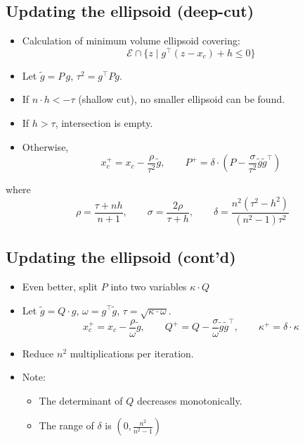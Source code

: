 \documentclass[]{article}
\providecommand{\tightlist}{%
  \setlength{\itemsep}{0pt}\setlength{\parskip}{0pt}}
\begin{document}
\hypertarget{updating-the-ellipsoid-deep-cut}{%
\subsection{Updating the ellipsoid
(deep-cut)}\label{updating-the-ellipsoid-deep-cut}}

\begin{itemize}
\tightlist
\item
  Calculation of minimum volume ellipsoid covering:
  \[\mathcal{E} \cap \{z \mid g^\top (z - x_c) + h \leq 0 \}\]
\item
  Let \(\tilde{g} = P\,g\), \(\tau^2 = g^\top P g\).
\item
  If \(n \cdot h < -\tau\) (shallow cut), no smaller ellipsoid can be
  found.
\item
  If \(h > \tau\), intersection is empty.
\item
  Otherwise, \[x_c^+ = x_c - \frac{\rho}{ \tau^2 } \tilde{g}, \qquad
  P^+ = \delta\cdot\left(P - \frac{\sigma}{ \tau^2 } \tilde{g}\tilde{g}^\top\right)\]
\end{itemize}

where \[\rho = \frac{ \tau+nh}{n+1}, \qquad
  \sigma = \frac{2\rho}{ \tau+h}, \qquad
  \delta = \frac{n^2(\tau^2 - h^2)}{(n^2 - 1)\tau^2}\]

\hypertarget{updating-the-ellipsoid-contd}{%
\subsection{Updating the ellipsoid
(cont'd)}\label{updating-the-ellipsoid-contd}}

\begin{itemize}
\tightlist
\item
  Even better, split \(P\) into two variables \(\kappa \cdot Q\)
\item
  Let \(\tilde{g} = Q \cdot g\), \(\omega = g^\top\tilde{g}\),
  \(\tau = \sqrt{\kappa\cdot\omega}\).
  \[x_c^+ = x_c - \frac{\rho}{\omega} \tilde{g}, \qquad
  Q^+ = Q - \frac{\sigma}{\omega} \tilde{g}\tilde{g}^\top, \qquad
  \kappa^+ =  \delta\cdot\kappa
   \]
\item
  Reduce \(n^2\) multiplications per iteration.
\item
  Note:

  \begin{itemize}
  \tightlist
  \item
    The determinant of \(Q\) decreases monotonically.
  \item
    The range of \(\delta\) is \((0, \frac{n^2}{n^2 - 1})\)
  \end{itemize}
\end{itemize}
\end{document}
